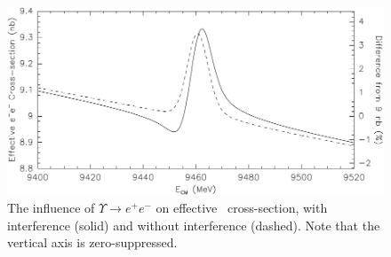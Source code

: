 \documentclass{cornell}
\begin{document}
\begin{figure}[p]
  \begin{center}
    \includegraphics[width=\linewidth]{newplots/allee}
  \end{center}
  \caption[Influence of $\Upsilon \to e^+e^-$ on effective \ee\
  cross-section]{\label{allee} The influence of $\Upsilon \to e^+e^-$
  on effective \ee\ cross-section, with interference (solid) and
  without interference (dashed).  Note that the vertical axis is
  zero-suppressed.}
\end{figure}
\end{document}
